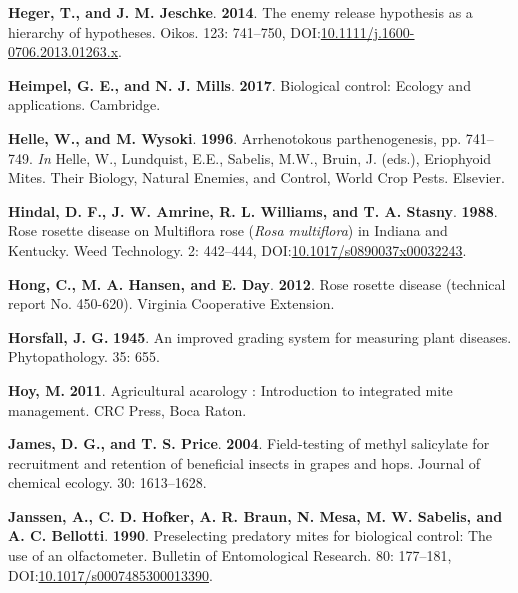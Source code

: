 \documentclass[12pt,final,CPage]{ufthesis}
\newlength{\cslhangindent}
\newenvironment{CSLReferences}[2] %
{%
	\setlength{\parindent}{0pt}
	\ifodd #1 \everypar{\setlength{\hangindent}{\cslhangindent}}\ignorespaces\fi
	\ifnum #2 > 0
	\setlength{\parskip}{#2\baselineskip}
	\fi
}%
{}
\begin{document}
{\begin{CSLReferences}{1}{0}
  \leavevmode{}%
  \textbf{Heger, T., and J. M. Jeschke}. \textbf{2014}. The enemy release hypothesis as a hierarchy of hypotheses. Oikos. 123: 741--750, DOI:\href{https://doi.org/10.1111/j.1600-0706.2013.01263.x}{10.1111/j.1600-0706.2013.01263.x}.

  \leavevmode{}%
  \textbf{Heimpel, G. E., and N. J. Mills}. \textbf{2017}. Biological control: Ecology and applications. Cambridge.

  \leavevmode{}%
  \textbf{Helle, W., and M. Wysoki}. \textbf{1996}. Arrhenotokous parthenogenesis, pp. 741--749. \emph{In} Helle, W., Lundquist, E.E., Sabelis, M.W., Bruin, J. (eds.), Eriophyoid Mites. Their Biology, Natural Enemies, and Control, World Crop Pests. Elsevier.

  \leavevmode{}%
  \textbf{Hindal, D. F., J. W. Amrine, R. L. Williams, and T. A. Stasny}. \textbf{1988}. {Rose rosette disease} on {Multiflora rose} ({\emph{Rosa multiflora}}) in {Indiana} and {Kentucky}. Weed Technology. 2: 442--444, DOI:\href{https://doi.org/10.1017/s0890037x00032243}{10.1017/s0890037x00032243}.

  \leavevmode{}%
  \textbf{Hong, C., M. A. Hansen, and E. Day}. \textbf{2012}. {Rose rosette disease} (technical report No. 450-620). Virginia Cooperative Extension.

  \leavevmode{}%
  \textbf{Horsfall, J. G.} \textbf{1945}. An improved grading system for measuring plant diseases. Phytopathology. 35: 655.

  \leavevmode{}%
  \textbf{Hoy, M.} \textbf{2011}. Agricultural acarology : Introduction to integrated mite management. CRC Press, Boca Raton.

  \leavevmode{}%
  \textbf{James, D. G., and T. S. Price}. \textbf{2004}. Field-testing of methyl salicylate for recruitment and retention of beneficial insects in grapes and hops. Journal of chemical ecology. 30: 1613--1628.

  \leavevmode{}%
  \textbf{Janssen, A., C. D. Hofker, A. R. Braun, N. Mesa, M. W. Sabelis, and A. C. Bellotti}. \textbf{1990}. Preselecting predatory mites for biological control: The use of an olfactometer. Bulletin of Entomological Research. 80: 177--181, DOI:\href{https://doi.org/10.1017/s0007485300013390}{10.1017/s0007485300013390}.


\end{CSLReferences}}
\end{document}
